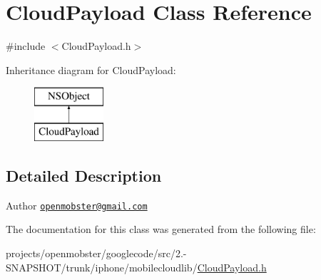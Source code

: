 \hypertarget{interface_cloud_payload}{
\section{\-Cloud\-Payload \-Class \-Reference}
\label{interface_cloud_payload}
}


{\ttfamily \#include $<$\-Cloud\-Payload.\-h$>$}

\-Inheritance diagram for \-Cloud\-Payload\-:\begin{figure}[H]
\begin{center}
\leavevmode
\includegraphics[height=2.000000cm]{interface_cloud_payload}
\end{center}
\end{figure}


\subsection{\-Detailed \-Description}
\begin{DoxyAuthor}{\-Author}
\href{mailto:openmobster@gmail.com}{\tt openmobster@gmail.\-com} 
\end{DoxyAuthor}


\-The documentation for this class was generated from the following file\-:\begin{DoxyCompactItemize}
\item 
projects/openmobster/googlecode/src/2.-\/\-S\-N\-A\-P\-S\-H\-O\-T/trunk/iphone/mobilecloudlib/\hyperlink{_cloud_payload_8h}{\-Cloud\-Payload.\-h}\end{DoxyCompactItemize}
